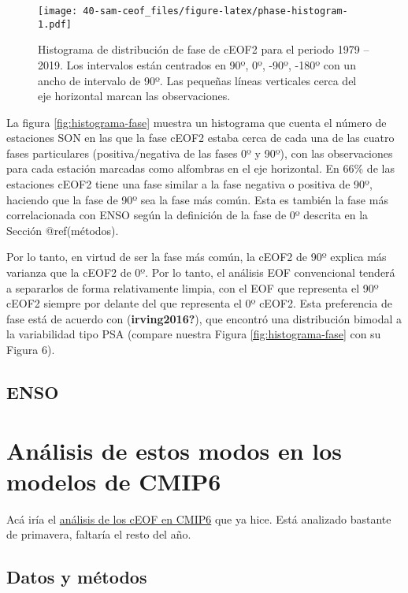 \documentclass[12pt,oneside]{reedthesis}
\begin{document}
\begin{figure}
\centering
\texttt{[image: 40-sam-ceof\_files/figure-latex/phase-histogram-1.pdf]}
\caption{\label{fig:phase-histogram}Histograma de distribución de fase de cEOF2 para el periodo 1979 -- 2019. Los intervalos están centrados en 90º, 0º, -90º, -180º con un ancho de intervalo de 90º. Las pequeñas líneas verticales cerca del eje horizontal marcan las observaciones.}
\end{figure}
La figura \ref{fig:histograma-fase} muestra un histograma que cuenta el número de estaciones SON en las que la fase cEOF2 estaba cerca de cada una de las cuatro fases particulares (positiva/negativa de las fases 0º y 90º), con las observaciones para cada estación marcadas como alfombras en el eje horizontal.
En 66\% de las estaciones cEOF2 tiene una fase similar a la fase negativa o positiva de 90º, haciendo que la fase de 90º sea la fase más común.
Esta es también la fase más correlacionada con ENSO según la definición de la fase de 0º descrita en la Sección @ref(métodos).

Por lo tanto, en virtud de ser la fase más común, la cEOF2 de 90º explica más varianza que la cEOF2 de 0º.
Por lo tanto, el análisis EOF convencional tenderá a separarlos de forma relativamente limpia, con el EOF que representa el 90º cEOF2 siempre por delante del que representa el 0º cEOF2.
Esta preferencia de fase está de acuerdo con (\textbf{irving2016?}), que encontró una distribución bimodal a la variabilidad tipo PSA (compare nuestra Figura \ref{fig:histograma-fase} con su Figura 6).

\hypertarget{enso}{%
\section{ENSO}\label{enso}}

\hypertarget{anuxe1lisis-de-estos-modos-en-los-modelos-de-cmip6}{%
\chapter{Análisis de estos modos en los modelos de CMIP6}\label{anuxe1lisis-de-estos-modos-en-los-modelos-de-cmip6}}

Acá iría el \href{https://htmlpreview.github.io/?https://github.com/eliocamp/onda3/blob/master/35-cEOF-CMIP6-superensemble-SON.html}{análisis de los cEOF en CMIP6} que ya hice. Está analizado bastante de primavera, faltaría el resto del año.

\hypertarget{datos-y-muxe9todos-3}{%
\section{Datos y métodos}\label{datos-y-muxe9todos-3}}
\end{document}
